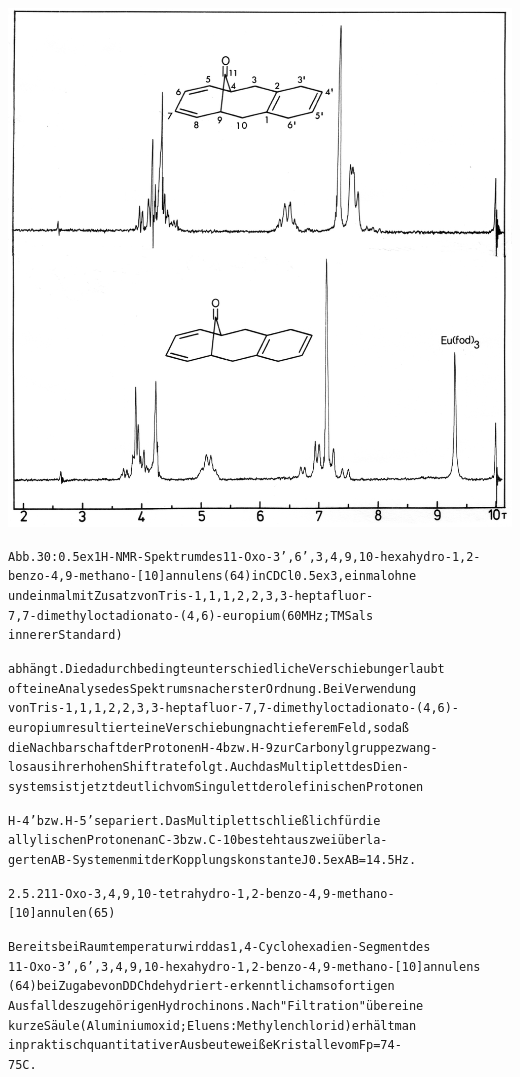 \documentclass[a4paper,11pt]{article}
\begin{document}
\hspace*{-0.25cm}\includegraphics[width=14.27cm]{NMR_030}
\begin{alltt}
Abb. 30: \raise0.5ex\hbox{1}H-NMR-Spektrum des 11-Oxo-3',6',3‚4‚9,10-hexahydro-1‚2-
benzo-4,9-methano-[10]annulens (64) in CDCl\lower0.5ex\hbox{3}, einmal ohne
und einmal mit Zusatz von Tris-1‚1‚1,2‚2,3,3-heptafluor-
7,7-dimethyloctadionato-(4,6)-europium (60 MHz; TMS als
innerer Standard)

abhängt. Die dadurch bedingte unterschiedliche Verschiebung erlaubt
oft eine Analyse des Spektrums nach erster Ordnung. Bei Verwendung
von Tris-1‚1‚1‚2,2‚3,3-heptafluor-7,7-dimethyloctadionato-(4,6)-
europium resultiert eine Verschiebung nach tieferem Feld, so daß
die Nachbarschaft der Protonen H-4 bzw. H-9 zur Carbonylgruppe zwang-
los aus ihrer hohen Shiftrate folgt. Auch das Multiplett des Dien-
systems ist jetzt deutlich vom Singulett der olefinischen Protonen

\newpage
{}


H-4' bzw. H-5' separiert. Das Multiplett schließlich für die
allylischen Protonen an C-3 bzw. C-10 besteht aus zwei überla-
gerten AB-Systemen mit der Kopplungskonstante J\lower0.5ex\hbox{AB} = 14.5 Hz.



2.5.2 11-Oxo-3,4,9,10-tetrahydro-1‚2-benzo-4,9-methano-
[10]annulen (65)
 

Bereits bei Raumtemperatur wird das 1‚4-Cyclohexadien-Segment des
11-Oxo-3',6',3,4,9‚10-hexahydro-1,2-benzo-4,9-methano-[10]annulens
(64) bei Zugabe von DDCh dehydriert - erkenntlich am sofortigen
Ausfall des zugehörigen Hydrochinons. Nach "Filtration" über eine
kurze Säule (Aluminiumoxid; Eluens: Methylenchlorid) erhält man
in praktisch quantitativer Ausbeute weiße Kristalle vom Fp = 74 -
75\degree{}C.

\end{alltt}
\end{document}
